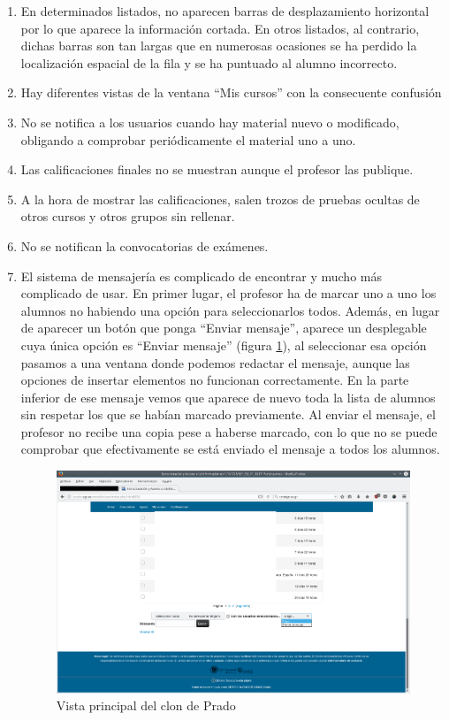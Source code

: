 \begin{enumerate}
\item En determinados listados, no aparecen barras de desplazamiento horizontal por lo que aparece la información cortada. En otros listados, al contrario, dichas barras son tan largas que en numerosas ocasiones se ha perdido la localización espacial de la fila y se ha puntuado al alumno incorrecto.

\item Hay diferentes vistas de la ventana ``Mis cursos'' con la consecuente confusión

\item No se notifica a los usuarios cuando hay material nuevo o modificado, obligando a comprobar periódicamente el material uno a uno.

\item Las calificaciones finales no se muestran aunque el profesor las publique.

\item A la hora de mostrar las calificaciones, salen trozos de pruebas ocultas de otros cursos y otros grupos sin rellenar.

\item No se notifican la convocatorias de exámenes.

\item El sistema de mensajería es complicado de encontrar y mucho más complicado de usar. En primer lugar, el profesor ha de marcar uno a uno los alumnos no habiendo una opción para seleccionarlos todos. Además, en lugar de aparecer un botón que ponga  ``Enviar mensaje'', aparece un desplegable cuya única opción es ``Enviar mensaje'' (figura \ref{fig:pantallazoPradoenviarMensaje}), al seleccionar esa opción pasamos a una ventana donde podemos redactar el mensaje, aunque las opciones de insertar elementos no funcionan correctamente. En la parte inferior de ese mensaje vemos que aparece de nuevo toda la lista de alumnos sin respetar los que se habían marcado previamente. Al enviar el mensaje, el profesor no recibe una copia pese a haberse marcado, con lo que no se puede comprobar que efectivamente se está enviado el mensaje a todos los alumnos.

\begin{figure}[h!]
\centering
\includegraphics[width=1.0\textwidth]{../screenshots/pantallazoPradoenviarMensaje}
\caption{Vista principal del clon de Prado}
\label{fig:pantallazoPradoenviarMensaje}
\end{figure}


\end{enumerate}
